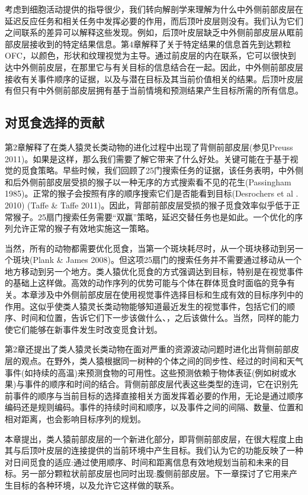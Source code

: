 考虑到细胞活动提供的指导很少，我们转向解剖学来理解为什么中外侧前部皮层在延迟反应任务和相关任务中发挥必要的作用，而后顶叶皮层则没有。我们认为它们之间联系的差异可以解释这些发现。例如，后顶叶皮层缺乏中外侧前部皮层从眶前部皮层接收到的特定结果信息。第4章解释了关于特定结果的信息首先到达颗粒OFC，以颜色，形状和纹理视觉为主导。通过前皮层的内在联系，它可以很快到达中外侧前皮层，在那里它与有关目标的信息结合在一起。因此，中外侧前部皮层接收有关事件顺序的证据，以及与潜在目标及其当前价值相关的结果。后顶叶皮层有但只有中外侧前部皮层拥有基于当前情境和预测结果产生目标所需的所有信息。

\subsection{对觅食选择的贡献}
第2章解释了在类人猿灵长类动物的进化过程中出现了背侧前部皮层(参见Preuss 2011)。如果是这样，那么我们需要了解它带来了什么好处。关键可能在于基于视觉的觅食策略。早些时候，我们回顾了25门搜索任务的证据，该任务表明，中外侧和后外侧前部皮层受损的猴子以一种无序的方式搜索看不见的花生(Passingham 1985)。正常的猴子会按照有序的顺序搜索它们是否能看到目标(Desrochers et al . 2010) (Taffe \& Taffe 2011)。因此，背部前部皮层受损的猴子觅食效率似乎低于正常猴子。25扇门搜索任务需要“双赢”策略，延迟交替任务也是如此。一个优化的序列允许正常的猴子有效地实施这一策略。

当然，所有的动物都需要优化觅食，当第一个斑块耗尽时，从一个斑块移动到另一个斑块(Plank \& James 2008)。但这项25扇门的搜索任务并不需要通过移动从一个地方移动到另一个地方。类人猿优化觅食的方式强调达到目标，特别是在视觉事件的基础上这样做。高效的动作序列的优势可能与个体在群体觅食时面临的竞争有关。本章涉及中外侧前部皮层在使用视觉事件选择目标和生成有效的目标序列中的作用。这似乎使类人猿灵长类动物能够知道最近发生的视觉事件，包括它们的顺序、时间和位置，告诉它们下一步该做什么、，之后该做什么。当然，同样的能力使它们能够在新事件发生时改变觅食计划。

第2章还提出了类人猿灵长类动物在面对严重的资源波动问题时进化出背侧前部皮层的观点。在野外，类人猿根据同一树种的个体之间的同步性、经过的时间和天气事件(如持续的高温)来预测食物的可用性。这些预测依赖于物体表征(例如树或水果)与事件的顺序和时间的结合。背侧前部皮层代表这些类型的连词，它在识别先前事件的顺序与当前目标的选择直接相关方面发挥着必要的作用，无论是通过顺序编码还是规则编码。事件的持续时间和顺序，以及事件之间的间隔、数量、位置和相对距离，也会影响目标序列的规划。

本章提出，类人猿前部皮层的一个新进化部分，即背侧前部皮层，在很大程度上由其与后顶叶皮层的连接提供的当前环境中产生目标。我们认为它的功能反映了一种对日间觅食的适应:通过使用顺序、时间和距离信息有效地规划当前和未来的目标。另一部分颗粒状前部皮层也同时出现:腹侧前部皮层。下一章探讨了它用来产生目标的各种环境，以及允许它这样做的联系。